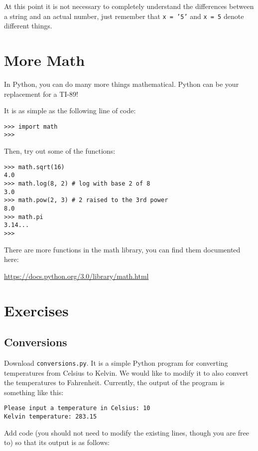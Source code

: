 \documentclass[12pt,hidelinks]{article}
\begin{document}
At this point it is not necessary to completely understand the differences between a string and an actual number, just remember that \texttt{x = '5'} and \texttt{x = 5} denote different things.

\pagebreak

\section{More Math}

In Python, you can do many more things mathematical. Python can be your
replacement for a TI-89!

It is as simple as the following line of code:
\begin{lstlisting}[style=bash]
>>> import math
>>>
\end{lstlisting}

Then, try out some of the functions:
\begin{lstlisting}[style=bash]
>>> math.sqrt(16)
4.0
>>> math.log(8, 2) # log with base 2 of 8
3.0
>>> math.pow(2, 3) # 2 raised to the 3rd power
8.0
>>> math.pi
3.14...
>>>
\end{lstlisting}

There are more functions in the math library, you can find them documented here:
\begin{center}
\url{https://docs.python.org/3.0/library/math.html}
\end{center}

\pagebreak

\section{Exercises}
\subsection{Conversions}
Download \texttt{conversions.py}. It is a simple Python program for converting temperatures from Celsius to Kelvin. We would like to modify it to also convert the temperatures to Fahrenheit. Currently, the output of the program is something like this:

\begin{lstlisting}[style=bash]
Please input a temperature in Celsius: 10
Kelvin temperature: 283.15
\end{lstlisting}

Add code (you should not need to modify the existing lines, though you are free to) so that its output is as follows:
\end{document}
